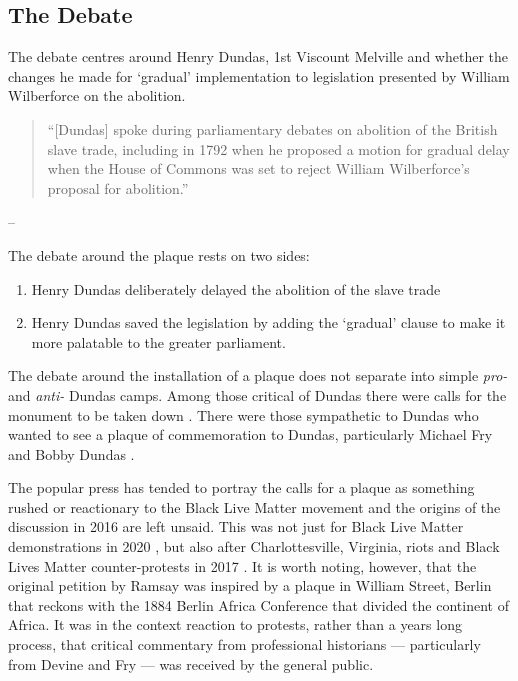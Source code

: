 \documentclass{scrartcl}
\renewcommand{\cite}{\parencite}
\begin{document}
\subsection{The Debate}

The debate centres around Henry Dundas, 1st Viscount Melville and whether the changes he made for `gradual' implementation to legislation presented by William Wilberforce on the abolition.

\begin{quotation}
    ``[Dundas] spoke during parliamentary debates on abolition of the British slave trade, including in 1792 when he proposed a motion for gradual delay when the House of Commons was set to reject William Wilberforce’s proposal for abolition.''
\end{quotation}
\begin{flushright}
-- \cite[][]{mullen_2021}
\end{flushright}

The debate around the plaque rests on two sides:

\begin{enumerate}
    \item Henry Dundas deliberately delayed the abolition of the slave trade
    \item Henry Dundas saved the legislation by adding the `gradual' clause to make it more palatable to the greater parliament. 
\end{enumerate}

The debate around the installation of a plaque does not separate into simple \textit{pro-} and \textit{anti-} Dundas camps. 
Among those critical of Dundas there were calls for the monument to be taken down \cite[][]{scotsman_2020,daily_2020,ramsay_2020}. There were those sympathetic to Dundas who wanted to see a plaque of commemoration to Dundas, particularly Michael Fry and Bobby Dundas \cite[][]{c4n_2018}.

The popular press has tended to portray the calls for a plaque as something rushed or reactionary to the Black Live Matter movement and the origins of the discussion in 2016 are left unsaid. This was not just for Black Live Matter demonstrations in 2020 \cite[][]{hoffman_2020, mitchell_2020, mckenna_2020}, but also after Charlottesville, Virginia, riots and Black Lives Matter counter-protests in 2017 \cite[][]{daily_2017}.
It is worth noting, however, that the original petition by Ramsay was inspired by a plaque in William Street, Berlin \cite[][]{ramsay_2016_2} that reckons with the 1884 Berlin Africa Conference that divided the continent of Africa.
It was in the context reaction to protests, rather than a years long process, that critical commentary from professional historians --- particularly from Devine \cite[][]{devine_2020} and Fry \cite[][]{fry_2020} --- was received by the general public.
\end{document}
